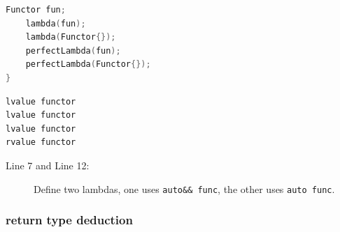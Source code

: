 \documentclass[a4paper,11pt,twoside]{book}
\begin{document}
\begin{itemize}
\begin{lstlisting}[frame=single, language=c++]
    Functor fun;
    lambda(fun);
    lambda(Functor{});
    perfectLambda(fun);
    perfectLambda(Functor{});
}
\end{lstlisting}

\begin{lstlisting}[frame=single, language=c++]
lvalue functor
lvalue functor
lvalue functor
rvalue functor
\end{lstlisting}
	
	\begin{description}
		\item[Line 7 and Line 12:] Define two lambdas, one uses \texttt{auto\&\& func}, the other uses \texttt{auto func}. 
	\end{description}
\end{itemize}

\subsubsection{return type deduction}
\end{document}
